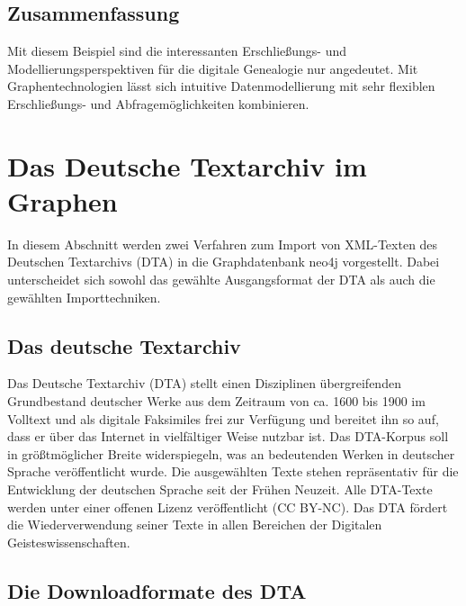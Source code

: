 \hypertarget{zusammenfassung-4}{%
\subsection{Zusammenfassung}\label{zusammenfassung-4}}

Mit diesem Beispiel sind die interessanten Erschließungs- und
Modellierungsperspektiven für die digitale Genealogie nur angedeutet.
Mit Graphentechnologien lässt sich intuitive Datenmodellierung mit sehr
flexiblen Erschließungs- und Abfragemöglichkeiten kombinieren.

\hypertarget{das-deutsche-textarchiv-im-graphen}{%
\section{Das Deutsche Textarchiv im
Graphen}\label{das-deutsche-textarchiv-im-graphen}}

In diesem Abschnitt werden zwei Verfahren zum Import von XML-Texten des
Deutschen Textarchivs (DTA) in die Graphdatenbank neo4j vorgestellt.
Dabei unterscheidet sich sowohl das gewählte Ausgangsformat der DTA als
auch die gewählten Importtechniken.

\hypertarget{das-deutsche-textarchiv}{%
\subsection{Das deutsche Textarchiv}\label{das-deutsche-textarchiv}}

Das Deutsche Textarchiv (DTA) stellt einen Disziplinen übergreifenden
Grundbestand deutscher Werke aus dem Zeitraum von ca. 1600 bis 1900 im
Volltext und als digitale Faksimiles frei zur Verfügung und bereitet ihn
so auf, dass er über das Internet in vielfältiger Weise nutzbar ist. Das
DTA-Korpus soll in größtmöglicher Breite widerspiegeln, was an
bedeutenden Werken in deutscher Sprache veröffentlicht wurde. Die
ausgewählten Texte stehen repräsentativ für die Entwicklung der
deutschen Sprache seit der Frühen Neuzeit. Alle DTA-Texte werden unter
einer offenen Lizenz veröffentlicht (CC BY-NC). Das DTA fördert die
Wiederverwendung seiner Texte in allen Bereichen der Digitalen
Geisteswissenschaften.

\hypertarget{die-downloadformate-des-dta}{%
\subsection{Die Downloadformate des
DTA}\label{die-downloadformate-des-dta}}

